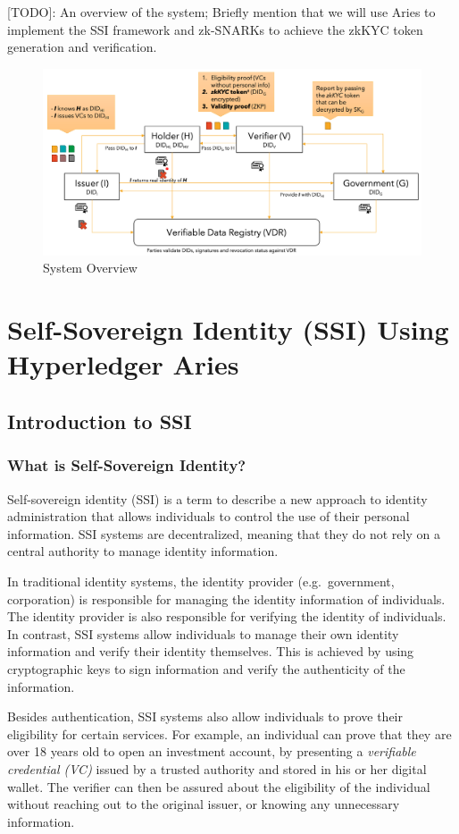 \documentclass[
]{report}
\begin{document}
{[}TODO{]}: An overview of the system; Briefly mention that we
will use Aries to implement the SSI framework and zk-SNARKs to achieve
the zkKYC token generation and verification.

\begin{figure}
\centering
\includegraphics{zkkyc-system.png}
\caption{System Overview}
\end{figure}

\chapter{Self-Sovereign Identity (SSI) Using Hyperledger Aries}

\section{Introduction to SSI}
\subsection{What is Self-Sovereign Identity?}
Self-sovereign identity (SSI) is a term to describe a new approach to
identity administration that allows individuals to control the use of
their personal information. SSI systems are decentralized, meaning that
they do not rely on a central authority to manage identity information.

In traditional identity systems, the identity provider (e.g.~government,
corporation) is responsible for managing the identity information of
individuals. The identity provider is also responsible for verifying
the identity of individuals. In contrast, SSI systems allow individuals
to manage their own identity information and verify their identity
themselves. This is achieved by using cryptographic keys to sign
information and verify the authenticity of the information.

Besides authentication, SSI systems also allow individuals to prove their
eligibility for certain services. For example, an individual can prove
that they are over 18 years old to open an investment account, by
presenting a \emph{verifiable credential (VC)} issued by a trusted
authority and stored in his or her digital wallet. The verifier can
then be assured about the eligibility of the individual without reaching
out to the original issuer, or knowing any unnecessary information.
\end{document}
